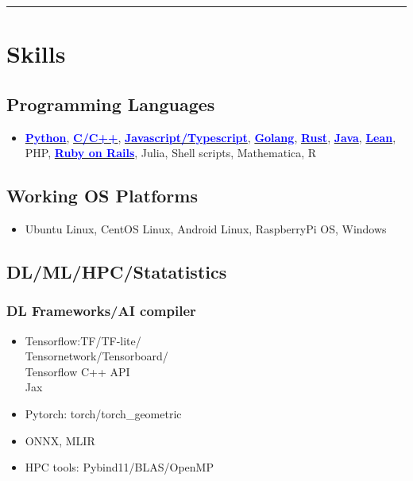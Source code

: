 \documentclass[11pt]{article}
\begin{document}
\begin{multicols*}{2}
\hrule

\section*{Skills}
\subsection*{Programming Languages}
\begin{itemize}[noitemsep]
    \item \href{https://github.com/Kuo-TingKai/submarine-cable-monitor}{\textbf{\textcolor{blue}{Python}}}, 
    \href{https://github.com/Kuo-TingKai/cpp_linux_chat}{\textbf{\textcolor{blue}{C/C++}}}, 
    \href{https://github.com/Kuo-TingKai/three-3d-game}{\textbf{\textcolor{blue}{Javascript/Typescript}}}, 
    \href{https://github.com/Kuo-TingKai/golang-web3-app}{\textbf{\textcolor{blue}{Golang}}},
    \href{https://github.com/xiph/rav1e/compare/master...Kuo-TingKai:rav1e:master}{\textbf{\textcolor{blue}{Rust}}},
    \href{https://github.com/Kuo-TingKai/java-backend-cloud-maven-app}{\textbf{\textcolor{blue}{Java}}}, 
    \href{https://github.com/Kuo-TingKai/lean4-basic-ag}{\textbf{\textcolor{blue}{Lean}}}, PHP, 
    \href{https://github.com/Kuo-TingKai/RoR-app}{\textbf{\textcolor{blue}{Ruby on Rails}}}, 
    Julia, Shell scripts, Mathematica, R
\end{itemize}

\subsection*{Working OS Platforms}
\begin{itemize}[noitemsep]
    \item Ubuntu Linux, CentOS Linux, Android Linux, RaspberryPi OS, Windows
\end{itemize}

\subsection*{DL/ML/HPC/Statatistics}

\subsubsection*{DL Frameworks/AI compiler}
\begin{itemize}[noitemsep]
    \item Tensorflow:TF/TF-lite/\\Tensornetwork/Tensorboard/\\Tensorflow C++ API\\
    Jax
    \item Pytorch: torch/torch\_geometric
    \item ONNX, MLIR
    \item HPC tools: Pybind11/BLAS/OpenMP 
\end{itemize}

\end{multicols*}
\end{document}
